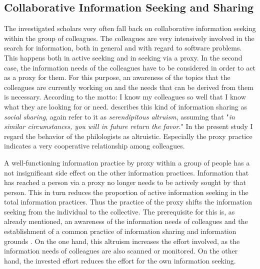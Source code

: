 \documentclass[12pt, a4paper, titlepage, oneside, abstract=true, toc=listof, toc=bibliography, BCOR=1cm]{scrreprt}
\begin{document}
{\subsection*{Collaborative Information Seeking and Sharing}
The investigated scholars very often fall back on collaborative information seeking \citep{Shah2010, Talja2006} within the group of colleagues. The colleagues are very intensively involved in the search for information, both in general and with regard to software problems. This happens both in active seeking and in seeking via a proxy. In the second case, the information needs of the colleagues have to be considered in order to act as a proxy for them. For this purpose, an awareness \citep{Dourish1992} of the topics that the colleagues are currently working on and the needs that can be derived from them is necessary. According to the motto: I know my colleagues so well that I know what they are looking for or need. \citet[p. 149]{Talja2002} describes this kind of information sharing as \textit{social sharing}, \citet[p. 774]{Twidale1997} again refer to it as \textit{serendipitous altruism}, assuming that "\textit{in similar circumstances, you will in future return the favor.}" In the present study I regard the behavior of the philologists as altruistic. Especially the proxy practice indicates a very cooperative relationship among colleagues. 

A well-functioning information practice by proxy within a group of people has a not insignificant side effect on the other information practices. Information that has reached a person via a proxy no longer needs to be actively sought by that person. This in turn reduces the proportion of active information seeking in the total information practices. Thus the practice of the proxy shifts the information seeking from the individual to the collective. The prerequisite for this is, as already mentioned, an awareness of the information needs of colleagues and the establishment of a common practice of information sharing and information grounds \citep{Hertzum2008}. On the one hand, this altruism increases the effort involved, as the information needs of colleagues are also scanned or monitored. On the other hand, the invested effort reduces the effort for the own information seeking. 

}
\end{document}
